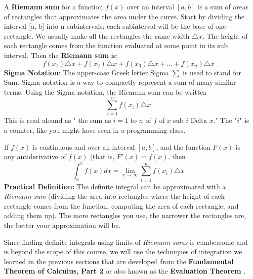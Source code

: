 \begin{tcolorbox}[title = {Riemann Sum}]
A \textbf{Riemann sum} for a function $f(x)$ over an interval $[a, b]$ is a sum of areas of rectangles that approximates the area under the curve. Start by dividing the interval [a, b] into n subintervals; each subinterval will be the base of one rectangle. We usually make all the rectangles the same width $\triangle x$. The height of each rectangle comes from the function evaluated at some point in its sub interval. Then the \textbf{Riemann sum} is:
\vspace*{-0.5cm}
\begin{equation}\label{eq:riemann}
    f(x_1)\triangle x+f(x_2)\triangle x+f(x_3)\triangle x+...+f(x_n)\triangle x
\end{equation}
\textbf{Sigma Notation}: The upper-case Greek letter Sigma $\sum$ is used to stand for Sum. Sigma notation is a way to compactly represent a sum of many similar terms. Using the Sigma notation, the Riemann sum can be written
\vspace*{-0.5cm}
\begin{equation}\label{eq:riemannSigma}
    \sum_{i=1}^{n} f(x_i)\triangle x 
\end{equation}
This is read alound as " the sum as $i=1$ to $n$ of $f$ of $x$ sub $i$ Delta $x$." The "$i$" is a counter, like you might have seen in a programming class.
\end{tcolorbox}
\vspace{3cm}
\begin{tcolorbox}[title = {Formal Definition of Definite Integral and Riemann Sum}]
\noindent If $f(x)$ is continuous and  over an interval $[a,b]$, and the function $F(x)$ is any antiderivative of $f(x)$ (that is, $F'(x)=f(x)$, then 
\begin{equation}\label{defIntgRiemann}
    \int_{a}^{b} f(x) dx=\lim_{x\to\infty}\sum_{i=1}^{n} f(x_i)\triangle x 
\end{equation}
\textbf{Practical Definition: }The definite integral can be approximated with a \emph{Riemann sum} (dividing the area into rectangles where the height of each rectangle comes from the function, computing the area of each rectangle, and adding them up). The more rectangles you use, the narrower the rectangles are, the better your approximation will be.
\end{tcolorbox}

\newpage
\noindent Since finding definite integrals using limits of \emph{Riemann sums} is cumbersome and is beyond the scope of this course, we will use the techniques of integration we learned in the previous sections that are developed from the \textbf{Fundamental Theorem of Calculus, Part 2 } or also known as the \textbf{Evaluation Theorem} .

